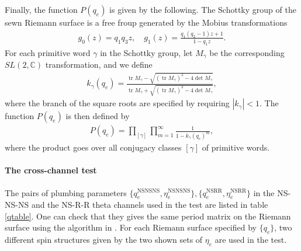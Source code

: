 \documentclass[12pt]{article}
\def\ie{\begin{equation}\begin{aligned}}
\def\fe{\end{aligned}\end{equation}}
\def\NS{\mathrm{NS}}
\def\R{\mathrm{R}}
\begin{document}
\begin{appendix}
Finally, the function $P(q_e)$ is given by the following. The Schottky group of the sewn Riemann surface is a free froup generated by the Mobius transformations
\ie
g_0(z) = q_1q_3z,\quad g_1(z) = \frac{q_1(q_2-1)z+1}{1-q_1z}.
\fe
For each primitive word $\gamma$ in the Schottky group, let $M_\gamma$ be the corresponding $SL(2,\mathbb{C})$ transformation, and we define
\ie
k_\gamma(q_e) = \frac{\operatorname{tr}M_\gamma-
  \sqrt{(\operatorname{tr}M_\gamma)^2-4\det M_\gamma}}
 {\operatorname{tr}M_\gamma+
  \sqrt{(\operatorname{tr}M_\gamma)^2-4\det M_\gamma}},
\fe
where the branch of the square roots are specified by requiring $|k_\gamma|<1$. The function $P(q_e)$ is then defined by
\ie
P(q_e) = \prod_{[\gamma]} \prod_{m=1}^\infty  \frac{1}{1-k_\gamma(q_e)^m},
\fe
where the product goes over all conjugacy classes $[\gamma]$ of primitive words.

\paragraph{The cross-channel test} The pairs of plumbing parameters $\{q_e^{\NS\NS\NS}, \eta_e^{\NS\NS\NS}\}, \{q_e^{\NS\R\R}, \eta_e^{\NS\R\R}\}$ in the NS-NS-NS and the NS-R-R theta channels used in the test are listed in table \ref{qtable}. One can check that they gives the same period matrix on the Riemann surface using the algorithm in \cite{Christian:new}. For each Riemann surface specified by $\{q_e\}$, two different spin structures given by the two shown sets of $\eta_e$ are used in the test.


\end{appendix}
\end{document}
